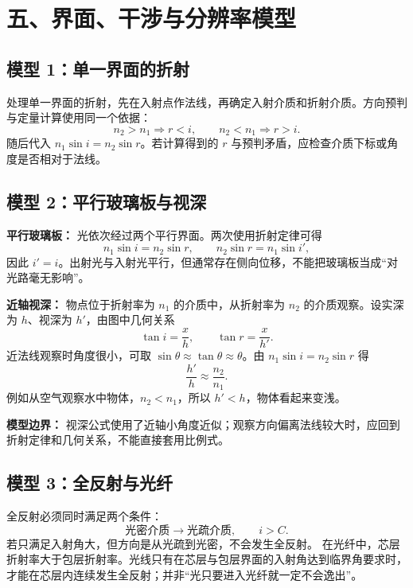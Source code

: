 \section*{五、界面、干涉与分辨率模型}

\subsection*{模型 1：单一界面的折射}

处理单一界面的折射，先在入射点作法线，再确定入射介质和折射介质。方向预判与定量计算使用同一个依据：
\[
n_2>n_1\Rightarrow r<i,\qquad n_2<n_1\Rightarrow r>i.
\]
随后代入 $n_1\sin i=n_2\sin r$。若计算得到的 $r$ 与预判矛盾，应检查介质下标或角度是否相对于法线。

\subsection*{模型 2：平行玻璃板与视深}

\textbf{平行玻璃板：} 光依次经过两个平行界面。两次使用折射定律可得
\[
n_1\sin i=n_2\sin r,\qquad n_2\sin r=n_1\sin i',
\]
因此 $i'=i$。出射光与入射光平行，但通常存在侧向位移，不能把玻璃板当成“对光路毫无影响”。

\textbf{近轴视深：} 物点位于折射率为 $n_1$ 的介质中，从折射率为 $n_2$ 的介质观察。设实深为 $h$、视深为 $h'$，由图中几何关系
\[
\tan i=\frac{x}{h},\qquad \tan r=\frac{x}{h'}.
\]
近法线观察时角度很小，可取 $\sin\theta\approx\tan\theta\approx\theta$。由
$n_1\sin i=n_2\sin r$ 得
\[
\boxed{\frac{h'}{h}\approx\frac{n_2}{n_1}}.
\]
例如从空气观察水中物体，$n_2<n_1$，所以 $h'<h$，物体看起来变浅。

\begin{center}


\label{fig:plane-mirror-apparent-depth}
\end{center}

\textbf{模型边界：} 视深公式使用了近轴小角度近似；观察方向偏离法线较大时，应回到折射定律和几何关系，不能直接套用比例式。

\subsection*{模型 3：全反射与光纤}

全反射必须同时满足两个条件：
\[
\text{光密介质}\rightarrow\text{光疏介质},\qquad i>C.
\]
若只满足入射角大，但方向是从光疏到光密，不会发生全反射。
在光纤中，芯层折射率大于包层折射率。光线只有在芯层与包层界面的入射角达到临界角要求时，才能在芯层内连续发生全反射；并非“光只要进入光纤就一定不会逸出”。

